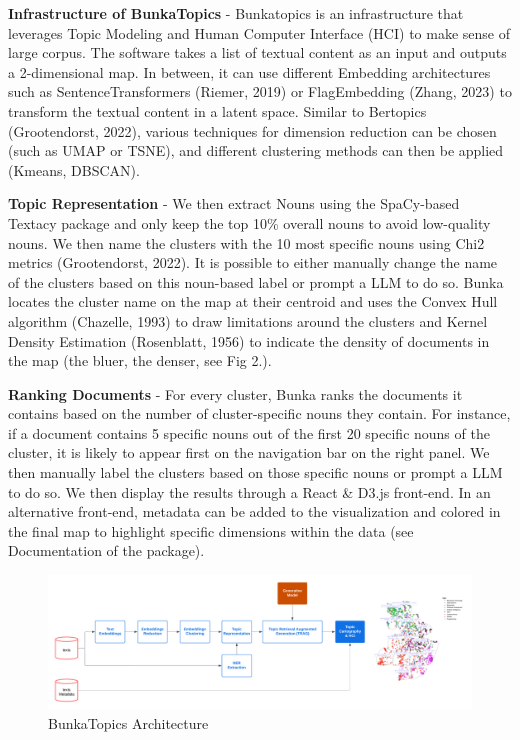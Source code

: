 \documentclass{article}
\begin{document}
\textbf{Infrastructure of BunkaTopics} - Bunkatopics is an infrastructure that leverages Topic Modeling and Human Computer Interface (HCI) to make sense of large corpus. The software takes a list of textual content as an input and outputs a 2-dimensional map. In between, it can use different Embedding architectures such as SentenceTransformers (Riemer, 2019) or FlagEmbedding (Zhang, 2023) to transform the textual content in a latent space. Similar to Bertopics (Grootendorst, 2022), various techniques for dimension reduction can be chosen (such as UMAP or TSNE), and different clustering methods can then be applied (Kmeans, DBSCAN). 

\textbf{Topic Representation} - We then extract Nouns using the SpaCy-based Textacy package and only keep the top 10\% overall nouns to avoid low-quality nouns. We then name the clusters with the 10 most specific nouns using Chi2 metrics (Grootendorst, 2022). It is possible to either manually change the name of the clusters based on this noun-based label or prompt a LLM to do so. Bunka locates the cluster name on the map at their centroid and uses the Convex Hull algorithm (Chazelle, 1993) to draw limitations around the clusters and Kernel Density Estimation (Rosenblatt, 1956) to indicate the density of documents in the map (the bluer, the denser, see Fig 2.). 

\textbf{Ranking Documents} - For every cluster, Bunka ranks the documents it contains based on the number of cluster-specific nouns they contain. For instance, if a document contains 5 specific nouns out of the first 20 specific nouns of the cluster, it is likely to appear first on the navigation bar on the right panel. We then manually label the clusters based on those specific nouns or prompt a LLM to do so. We then display the results through a React \& D3.js front-end. In an alternative front-end, metadata can be added to the visualization and colored in the final map to highlight specific dimensions within the data (see Documentation of the package).

\begin{figure}[h] %
  \centering %
  \includegraphics[width=12cm]{img/bunka-architecture.png} %
  \caption{BunkaTopics Architecture} %
\end{figure}
\end{document}
